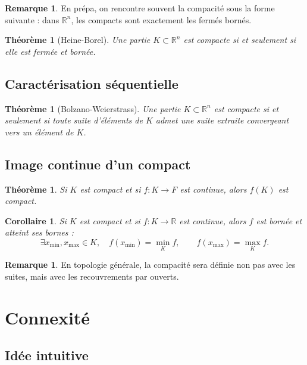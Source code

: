\documentclass[11pt,a4paper]{article}
\theoremstyle{definition}
\newtheorem{remarque}[definition]{Remarque}
\theoremstyle{plain}
\newtheorem{theoreme}[definition]{Théorème}
\newtheorem{corollaire}[definition]{Corollaire}
\newcommand{\R}{\mathbb{R}}
\begin{document}
\begin{remarque}
En prépa, on rencontre souvent la compacité sous la forme suivante :
dans $\R^n$, les compacts sont exactement les fermés bornés.
\end{remarque}

\begin{theoreme}[Heine-Borel]
Une partie $K\subset\R^n$ est compacte si et seulement si elle est fermée et bornée.
\end{theoreme}

\subsection{Caractérisation séquentielle}

\begin{theoreme}[Bolzano-Weierstrass]
Une partie $K\subset\R^n$ est compacte si et seulement si toute suite d'éléments de $K$ admet une suite extraite convergeant vers un élément de $K$.
\end{theoreme}

\subsection{Image continue d'un compact}

\begin{theoreme}
Si $K$ est compact et si $f:K\to F$ est continue, alors $f(K)$ est compact.
\end{theoreme}

\begin{corollaire}
Si $K$ est compact et si $f:K\to\R$ est continue, alors $f$ est bornée et atteint ses bornes :
\[
\exists x_{\min},x_{\max}\in K,\quad
f(x_{\min})=\min_K f,
\qquad
f(x_{\max})=\max_K f.
\]
\end{corollaire}

\begin{remarque}
En topologie générale, la compacité sera définie non pas avec les suites, mais avec les recouvrements par ouverts.
\end{remarque}

\section{Connexité}

\subsection{Idée intuitive}
\end{document}
